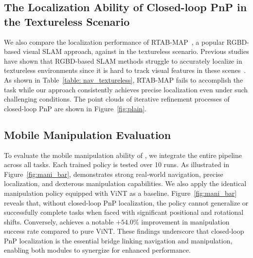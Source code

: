 \subsection{The Localization Ability of Closed-loop PnP in the Textureless Scenario}

We also compare the localization performance of RTAB-MAP~\cite{Labb__2018}, a popular RGBD-based visual SLAM approach, against \ourshort in the textureless scenario. Previous studies have shown that RGBD-based SLAM methods struggle to accurately localize in textureless environments since it is hard to track visual features in these scenes~\cite{Labb__2018,Campos_2021,s19102251}. As shown in Table~\ref{table: nav_textureless}, RTAB-MAP fails to accomplish the task while our approach consistently achieves precise localization even under such challenging conditions. The point clouds of iterative refinement processes of closed-loop PnP are shown in Figure~\ref{fig:plain}.


\begin{table}[h]
\centering
\caption{Comparison of \ourshort and RTAB-MAP in the textureless scenario.}
\label{table: nav_textureless}
\end{table}


\subsection{Mobile Manipulation Evaluation}
To evaluate the mobile manipulation ability of \ourshort, we integrate the entire pipeline across all tasks. Each trained policy is tested over 10 runs. As illustrated in Figure~\ref{fig:mani_bar}, \ourshort demonstrates strong real‑world navigation, precise localization, and dexterous manipulation capabilities. We also apply the identical manipulation policy equipped with ViNT as a baseline. Figure~\ref{fig:mani_bar} reveals that, without closed-loop PnP localization, the policy cannot generalize or successfully complete tasks when faced with significant positional and rotational shifts. Conversely, \ourshort achieves a notable $\mathbf{+54.0}$\% improvement in manipulation success rate compared to pure ViNT. These findings underscore that closed-loop PnP localization is the essential bridge linking navigation and manipulation, enabling both modules to synergize for enhanced performance.